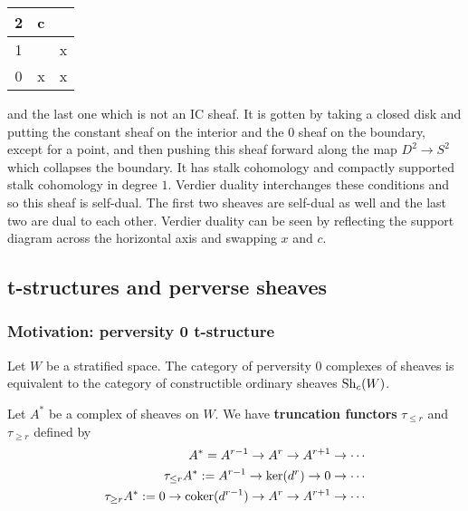 \documentclass[12pt]{article}
\begin{document}
\begin{example}
\begin{center}
\begin{tabular}{|c|c|c|}
            2                    & c &   \\
            \hline
            1                    &   & x \\
            \hline
            0                    & x & x \\
            \hline
        \end{tabular}
    \end{center}
    and the last one which is not an IC sheaf. It is gotten by taking a closed disk and putting the constant sheaf on the interior
    and the 0 sheaf on the boundary, except for a point, and then pushing
    this sheaf forward along the map $D^2\to S^2$ which collapses the boundary. It has
    stalk cohomology and compactly supported stalk cohomology in degree $1$. Verdier duality
    interchanges these conditions and so this sheaf is self-dual. The first two sheaves
    are self-dual as well and the last two are dual to each other. Verdier duality can be seen
    by reflecting the support diagram across the horizontal axis and swapping $x$ and $c$.
\end{example}

\subsection{t-structures and perverse sheaves}
\subsubsection{Motivation: perversity 0 t-structure}
Let $W$ be a stratified space. The category of perversity 0 complexes
of sheaves is equivalent to the category of
constructible ordinary sheaves $\operatorname{Sh}_c(W)$.

\begin{definition}
    Let $A^*$ be a complex of sheaves on $W$.
    We have \textbf{truncation functors} $\tau_{\leq r} $ and $ \tau_{\geq r}$ defined by
    \begin{align*}
        A^* = A^{r-1} \to A^r \to A^{r+1} \to \cdots               \\
        \tau_{\leq r}A^* := A^{r-1} \to \ker(d^r) \to 0 \to \cdots \\
        \tau_{\geq r}A^* := 0 \to \operatorname{coker}(d^{r-1}) \to A^r \to A^{r+1} \to \cdots
    \end{align*}
\end{definition}
\end{document}
